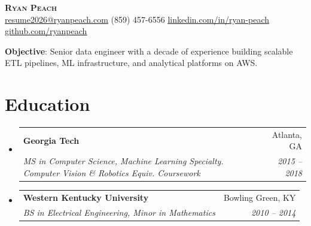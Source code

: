 \documentclass[letterpaper,11pt]{article}
\makeatletter
\newcommand{\resumeSubheading}[4]{
  \vspace{-2pt}\item
    \begin{tabular*}{0.97\textwidth}[t]{l@{\extracolsep{\fill}}r}
      \textbf{#1} & #2 \\
      \textit{\small#3} & \textit{\small #4} \\
    \end{tabular*}\vspace{-7pt}
}
\newcommand{\resumeSubSubheading}[2]{
    \item
    \begin{tabular*}{0.97\textwidth}{l@{\extracolsep{\fill}}r}
      \textit{\small#1} & \textit{\small #2} \\
    \end{tabular*}\vspace{-7pt}
}
\newcommand{\resumeSubHeadingListStart}{\begin{itemize}[leftmargin=0.15in, label={}]}
\newcommand{\resumeSubHeadingListEnd}{\end{itemize}}
\makeatother
\begin{document}
\pagecolor{white}


\begin{center}
    \textbf{\Huge \scshape Ryan Peach} \\ \vspace{1pt}
    \href{mailto:resume2026@ryanpeach.com}{\underline{resume2026@ryanpeach.com}} \textbar{}
    (859) 457-6556 \textbar{}
    \href{https://www.linkedin.com/in/ryan-peach/}{\underline{linkedin.com/in/ryan-peach}} \textbar{}
    \href{https://github.com/ryanpeach}{\underline{github.com/ryanpeach}}
\end{center}

\begin{center}
\textbf{Objective}: Senior data engineer with a decade of experience building scalable ETL pipelines, ML infrastructure, and analytical platforms on AWS.
\end{center}


\section{Education}
  \resumeSubHeadingListStart
    \resumeSubheading
      {Georgia Tech}{Atlanta, GA}
      {MS in Computer Science, Machine Learning Specialty. Computer Vision \& Robotics Equiv. Coursework}{2015 -- 2018}
    \resumeSubheading
      {Western Kentucky University}{Bowling Green, KY}
      {BS in Electrical Engineering, Minor in Mathematics}{2010 -- 2014}
  \resumeSubHeadingListEnd


\end{document}
